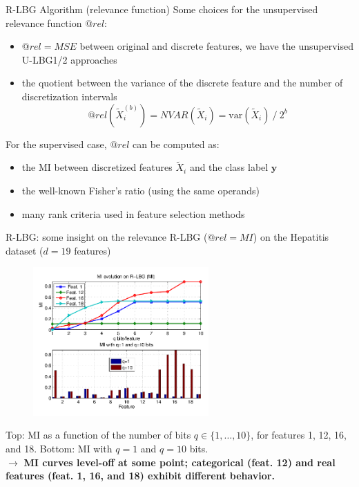 \documentclass{beamer}
\begin{document}
\begin{frame}{R-LBG Algorithm (relevance function)}
Some choices for the unsupervised relevance function $@rel$:
\begin{itemize}
	\item $@rel=MSE$ between original and discrete features, 
	we have the unsupervised U-LBG1/2 approaches 
	
	\item the quotient between the variance of the discrete feature and
	the number of discretization intervals
	\begin{equation} \nonumber
	@rel(\widetilde{X}_i^{(b)}) = NVAR(\widetilde{X}_i) = \mbox{var}(\widetilde{X}_i)\  / \ 2^{b}
	\end{equation}
\end{itemize}

\vfill
For the supervised case, $@rel$ can be computed as:
\begin{itemize}
	\item the MI between discretized
features $\widetilde{X}_i$ and the class label $\mathbf{y}$

	\item the well-known Fisher's ratio (using the same operands)
	
	\item many rank criteria used in feature selection methods 
\end{itemize}
\end{frame}


\begin{frame}{R-LBG: some insight on the relevance}
R-LBG ($@rel=MI$) on the Hepatitis dataset ($d=19$ features)
\begin{figure}
	\centering
	\includegraphics[width=0.6\textwidth]{fig1.png}
\end{figure}
\vspace{-2mm}
{\small Top: MI as
  a function of the number of bits $q \in  \{1,\ldots,10\}$, for features 1,
  12, 16, and 18. Bottom: MI with $q=1$ and $q=10$ bits.\\  
  $\longrightarrow$ \textbf{MI curves level-off at some point; categorical (feat. 12) and real features (feat. 1, 16, and 18) 
  exhibit different behavior.}}
\end{frame}
\end{document}
